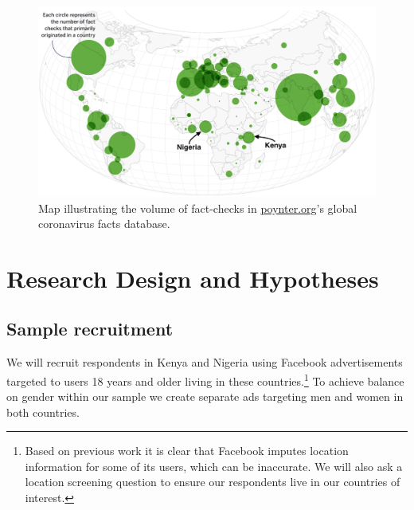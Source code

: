 \documentclass[letterpaper, 12pt, parskip=full, headsepline]{scrartcl}
\begin{document}

\begin{figure}[htb]
\centering
\caption{Map illustrating the volume of fact-checks in \url{poynter.org}'s global coronavirus facts database.}
\label{fig:poynter}
\includegraphics[width=.95\textwidth]{poynter2.png}
\end{figure}


\section{Research Design and Hypotheses}



\subsection{Sample recruitment}
We will recruit respondents in Kenya and Nigeria using Facebook advertisements targeted to users 18 years and older living in these countries.\footnote{Based on previous work it is clear that Facebook imputes location information for some of its users, which can be inaccurate. We will also ask a location screening question to ensure our respondents live in our countries of interest.} To achieve balance on gender within our sample we create separate ads targeting men and women in both countries. 

\end{document}
